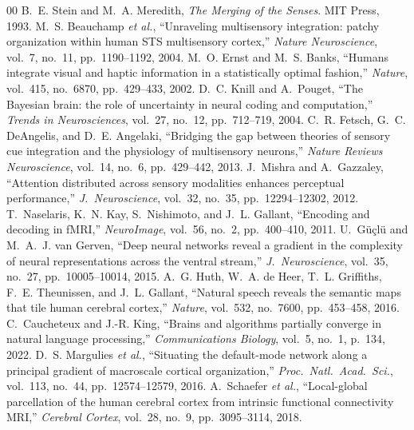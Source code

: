 \documentclass[conference]{IEEEtran}
\begin{document}
\begin{thebibliography}{00}
 B.~E. Stein and M.~A. Meredith, \textit{The Merging of the Senses}. MIT Press, 1993.
 M.~S. Beauchamp \textit{et al.}, ``Unraveling multisensory integration: patchy organization within human STS multisensory cortex,'' \textit{Nature Neuroscience}, vol.~7, no.~11, pp.~1190--1192, 2004.
 M.~O. Ernst and M.~S. Banks, ``Humans integrate visual and haptic information in a statistically optimal fashion,'' \textit{Nature}, vol.~415, no.~6870, pp.~429--433, 2002.
 D.~C. Knill and A.~Pouget, ``The Bayesian brain: the role of uncertainty in neural coding and computation,'' \textit{Trends in Neurosciences}, vol.~27, no.~12, pp.~712--719, 2004.
 C.~R. Fetsch, G.~C. DeAngelis, and D.~E. Angelaki, ``Bridging the gap between theories of sensory cue integration and the physiology of multisensory neurons,'' \textit{Nature Reviews Neuroscience}, vol.~14, no.~6, pp.~429--442, 2013.
 J.~Mishra and A.~Gazzaley, ``Attention distributed across sensory modalities enhances perceptual performance,'' \textit{J.~Neuroscience}, vol.~32, no.~35, pp.~12294--12302, 2012.
 T.~Naselaris, K.~N. Kay, S.~Nishimoto, and J.~L. Gallant, ``Encoding and decoding in fMRI,'' \textit{NeuroImage}, vol.~56, no.~2, pp.~400--410, 2011.
 U.~G{\"u}{\c{c}}l{\"u} and M.~A.~J. van Gerven, ``Deep neural networks reveal a gradient in the complexity of neural representations across the ventral stream,'' \textit{J.~Neuroscience}, vol.~35, no.~27, pp.~10005--10014, 2015.
 A.~G. Huth, W.~A. de Heer, T.~L. Griffiths, F.~E. Theunissen, and J.~L. Gallant, ``Natural speech reveals the semantic maps that tile human cerebral cortex,'' \textit{Nature}, vol.~532, no.~7600, pp.~453--458, 2016.
 C.~Caucheteux and J.-R. King, ``Brains and algorithms partially converge in natural language processing,'' \textit{Communications Biology}, vol.~5, no.~1, p.~134, 2022.
 D.~S. Margulies \textit{et al.}, ``Situating the default-mode network along a principal gradient of macroscale cortical organization,'' \textit{Proc.~Natl.~Acad.~Sci.}, vol.~113, no.~44, pp.~12574--12579, 2016.
 A.~Schaefer \textit{et al.}, ``Local-global parcellation of the human cerebral cortex from intrinsic functional connectivity MRI,'' \textit{Cerebral Cortex}, vol.~28, no.~9, pp.~3095--3114, 2018.

\end{thebibliography}
\end{document}
